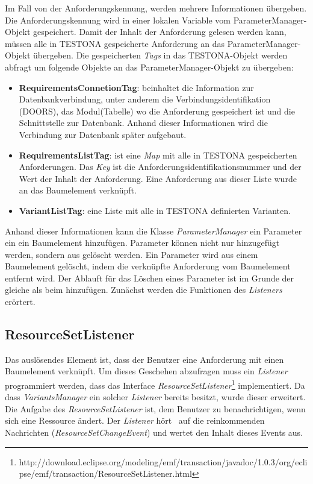 Im Fall von der Anforderungskennung, werden mehrere Informationen übergeben. Die Anforderungskennung wird in einer lokalen Variable vom ParameterManager-Objekt gespeichert. Damit der Inhalt der Anforderung gelesen werden kann, müssen alle in TESTONA gespeicherte Anforderung an das ParameterManager-Objekt übergeben. Die gespeicherten \textit{Tags} in das TESTONA-Objekt werden abfragt um folgende Objekte an das ParameterManager-Objekt zu übergeben:


\begin{itemize}
\item \textbf{RequirementsConnetionTag}: beinhaltet die Information zur Datenbankverbindung, unter anderem die Verbindungsidentifikation (DOORS), das Modul(Tabelle) wo die Anforderung gespeichert ist und die Schnittstelle zur Datenbank. Anhand dieser Informationen wird die Verbindung zur Datenbank später aufgebaut.
\item \textbf{RequirementsListTag}: ist eine \textit{Map} mit alle in TESTONA gespeicherten Anforderungen. Das \textit{Key} ist die Anforderungsidentifikationsnummer und der Wert der Inhalt der Anforderung. Eine Anforderung aus dieser Liste wurde an das Baumelement verknüpft.
\item \textbf{VariantListTag}: eine Liste mit alle in TESTONA definierten Varianten.
\end{itemize}


Anhand dieser Informationen kann die Klasse \textit{ParameterManager} ein Parameter ein ein Baumelement hinzufügen. Parameter können nicht nur hinzugefügt werden, sondern aus gelöscht werden. Ein Parameter wird aus einem Baumelement gelöscht, indem die verknüpfte Anforderung vom Baumelement entfernt wird. Der Ablauft für das Löschen eines Parameter ist im Grunde der gleiche als beim hinzufügen. Zunächst werden die Funktionen des \textit{Listeners} erörtert.




\subsection{ResourceSetListener}\label{sub:RSListner}
Das auslösendes Element ist, dass der Benutzer eine Anforderung mit einen Baumelement verknüpft. Um dieses Geschehen abzufragen muss ein \textit{Listener} programmiert werden, dass das Interface \textit{ResourceSetListener}\footnote{http://download.eclipse.org/modeling/emf/transaction/javadoc/1.0.3/org/eclipse/emf/transaction/ResourceSetListener.html} implementiert. Da dass \textit{VariantsManager} ein solcher \textit{Listener} bereits besitzt, wurde dieser erweitert. Die Aufgabe des \textit{ResourceSetListener} ist, dem Benutzer zu benachrichtigen, wenn sich eine Ressource ändert. Der \textit{Listener}  \glqq hört\grqq~ auf die reinkommenden Nachrichten (\textit{ResourceSetChangeEvent}) und wertet den Inhalt dieses Events aus.\\

